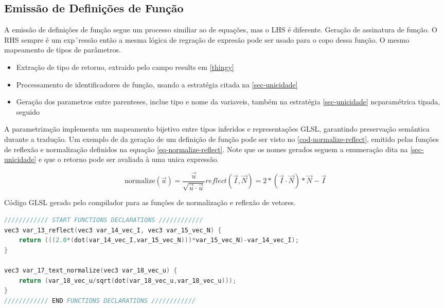 \subsection{Emissão de Definições de Função}
A emissão de definições de função segue um processo similiar ao de equações, mas o LHS é diferente. Geração de assinatura de função. O RHS sempre é um exp´ressão então a mesma lógica de regração de expresão pode ser usado para o copo dessa função. O mesmo mapeamento de tipos de parâmetros.

\begin{itemize}
   \item Extração de tipo de retorno, extraido pelo campo results em \autoref{thingy}
   \item Processamento de identificadores de função, usando a estratégia citada na \autoref{sec-unicidade}
   \item Geração dos parametros entre parenteses, inclue tipo e nome da variaveis, também na estratégia \autoref{sec-unicidade}  ncparamétrica tipada, seguido
\end{itemize}

A parametrização implementa um mapeamento bijetivo entre tipos inferidos e representações GLSL, garantindo preservação semântica durante a tradução.
Um exemplo de da geração de um definição de função pode ser visto no \autoref{cod-normalize-reflect}, emitido pelas funções de reflexão e normalização definidos na equação \autoref{eq-normalize-reflect}. Note que os nomes gerados seguem a enumeração dita na \autoref{sec-unicidade} e que o retorno pode ser avaliada à uma unica expressão.


\label{eq-normalize-reflect} \begin{subequations}
\begin{equation}
  \text{normalize}(\vec{u}) = \frac{\vec{u}}{\sqrt{\vec{u} \cdot \vec{u}}}
\end{equation}

\begin{equation}
reflect(\vec I, \vec N) =  2*(\vec I \cdot \vec N)*\vec N - \vec I
\end{equation}
\end{subequations}

\begin{codigo}[htb]
   \caption{\small Código GLSL gerado pelo compilador para as funções de normalização e reflexão de vetores. }
   \label{cod-normalize-reflect}
\begin{lstlisting}[language=C, inputencoding=utf8]
//////////// START FUNCTIONS DECLARATIONS ////////////
vec3 var_13_reflect(vec3 var_14_vec_I, vec3 var_15_vec_N) {
    return (((2.0*(dot(var_14_vec_I,var_15_vec_N)))*var_15_vec_N)-var_14_vec_I);
}

vec3 var_17_text_normalize(vec3 var_18_vec_u) {
    return (var_18_vec_u/sqrt(dot(var_18_vec_u,var_18_vec_u)));
}
//////////// END FUNCTIONS DECLARATIONS ////////////

\end{lstlisting}
\end{codigo}
